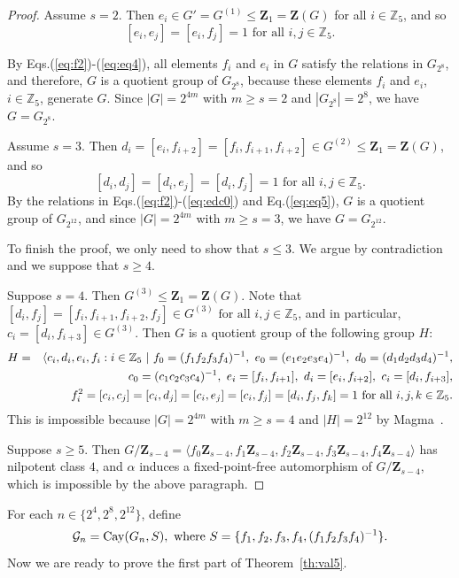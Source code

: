 \documentclass[12pt,reqno]{amsart}
\renewcommand\a{\alpha}  \renewcommand\b{\beta}
\newcommand\Z{\mathbf{Z}} \newcommand\ZZ{\mathbb{Z}}
\newcommand\mz{\mathbb{Z}}
\newcommand{\cG}{\mathcal{G}}
\numberwithin {equation} {section}
\begin{document}
\begin{proof}
Assume $s=2$. Then $e_i \in G'=G^{(1)} \leq \Z_{1}=\Z(G)$ for all $i\in\mz_5$, and so
\begin{equation}\label{eq:eq4}
[e_i,e_j]=[e_i,f_j]=1 \text{ for all } i,j \in \ZZ_5.
\end{equation}

By Eqs.(\ref{eq:f2})-(\ref{eq:eq4}), all elements $f_i$ and $e_i$ in $G$ satisfy the relations in
$G_{2^8}$, and therefore, $G$ is a quotient group of $G_{2^8}$, because these elements $f_i$ and $e_i$, $i\in\mz_5$, generate $G$. Since $|G|=2^{4m}$ with $m\geq s=2$ and $|G_{2^8}|=2^8$, we have $G=G_{2^8}$.

 Assume $s=3$. Then $d_i=[e_i,f_{i+2}]=[f_i,f_{i+1},f_{i+2}]  \in G^{(2)} \leq \Z_{1}=\Z(G)$, and so
 \begin{equation}\label{eq:eq5}
[d_i,d_j]=[d_i,e_j]=[d_i,f_j]=1 \text{ for all } i,j \in \ZZ_5.
\end{equation}
By the relations in Eqs.(\ref{eq:f2})-(\ref{eq:edc0}) and Eq.(\ref{eq:eq5}), $G$ is a quotient group of $G_{2^{12}}$, and since $|G|=2^{4m}$ with $m\geq s=3$, we have $G=G_{2^{12}}$.

To finish the proof, we only need to show that $s\leq 3$. We argue by contradiction and we suppose that $s\geq 4$.

Suppose $s=4$.  Then $G^{(3)} \leq \Z_{1}=\Z(G)$. Note that $[d_i,f_{j}]=[f_i,f_{i+1},f_{i+2},f_j] \in G^{(3)} \text{ for all } i,j \in \ZZ_5$, and in particular, $c_i=[d_i,f_{i+3}]\in G^{(3)} $. Then $G$ is a quotient group of the following group $H$:
\begin{eqnarray*}
 &H=&\langle c_i,d_i,e_i,f_i: i \in \ZZ_5 \ \lvert\   f_0=(f_1f_2f_3f_4)^{-1},~e_0=(e_1e_2e_3e_4)^{-1}, ~d_0=(d_1d_2d_3d_4)^{-1}, \\
 && c_0=(c_1c_2c_3c_4)^{-1},~e_i=[f_i,f_{i+1}],~ d_i=[e_i,f_{i+2}],~c_{i}=[d_i,f_{i+3}], \\
 && f_i^2=[c_i,c_j]=[c_i,d_j]=[c_i,e_j]=[c_i,f_j]=[d_i,f_j,f_{k}]=1 \text{ \rm for all } i,j,k \in \ZZ_5.
 \end{eqnarray*}
This is impossible because $|G|=2^{4m}$ with $m\geq s=4$ and $|H|=2^{12}$ by  {\sc Magma}~\cite{Magma}.

Suppose $s\geq 5$. Then $G/\Z_{s-4}=\langle f_0\Z_{s-4},f_1\Z_{s-4},f_2\Z_{s-4},f_3\Z_{s-4},
f_4\Z_{s-4} \rangle$ has nilpotent class $4$, and $\a$ induces a fixed-point-free automorphism of $G/\Z_{s-4}$, which is impossible by the above paragraph.  \end{proof}

For each $n\in \{2^4,2^8,2^{12}\}$,  define
\begin{equation}\label{eq:eq6}
\cG_n=\Cay(G_n,S), \text{ where } S=\{f_1,f_2,f_3,f_4,(f_1f_2f_3f_4)^{-1} \}.
\end{equation}
Now we are ready to prove the first part of Theorem~\ref{th:val5}.
\end{document}
